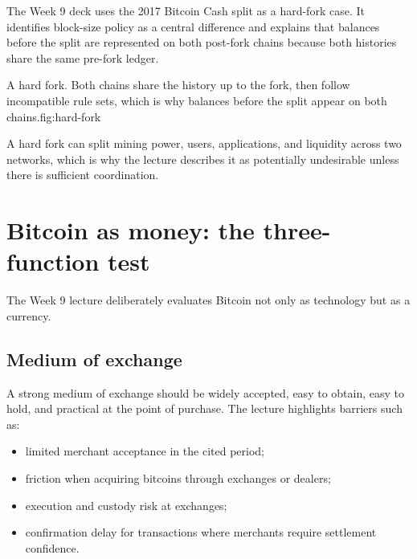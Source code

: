 The Week 9 deck uses the 2017 Bitcoin Cash split as a hard-fork case. It identifies block-size policy as a central difference and explains that balances before the split are represented on both post-fork chains because both histories share the same pre-fork ledger.

\begin{utpfig}{A hard fork. Both chains share the history up to the fork, then follow incompatible rule sets, which is why balances before the split appear on both chains.}{fig:hard-fork}
\end{utpfig}

A hard fork can split mining power, users, applications, and liquidity across two networks, which is why the lecture describes it as potentially undesirable unless there is sufficient coordination.

\section{Bitcoin as money: the three-function test}

The Week 9 lecture deliberately evaluates Bitcoin not only as technology but as a currency.

\subsection{Medium of exchange}

A strong medium of exchange should be widely accepted, easy to obtain, easy to hold, and practical at the point of purchase. The lecture highlights barriers such as:

\begin{itemize}
  \item limited merchant acceptance in the cited period;
  \item friction when acquiring bitcoins through exchanges or dealers;
  \item execution and custody risk at exchanges;
  \item confirmation delay for transactions where merchants require settlement confidence.
\end{itemize}


